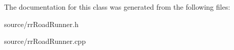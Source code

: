 The documentation for this class was generated from the following files\-:\begin{DoxyCompactItemize}
\item 
source/rr\-Road\-Runner.\-h\item 
source/rr\-Road\-Runner.\-cpp\end{DoxyCompactItemize}
